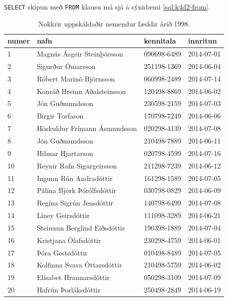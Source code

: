 \verb|SELECT| skipun með \verb|FROM| klausu má sjá á sýnidæmi \ref{sql:k4d2-from}.

\begin{table}
\centering
\caption[Nemendur]{Nokkrir uppskáldaðir nemendur fæddir árið 1998.}
\label{tafla:nemendur}
\begin{tabular}{llll}
\toprule
numer&nafn&kennitala&innritun\\
\midrule
1&Magnús Ásgeir Steinþórsson&090698-6489& 2014-07-01\\
2&Sigurður Ómarsson&251198-1369& 2014-06-04\\
3&Róbert Marinó Björnsson&060998-2489& 2014-07-14\\
4&Konráð Hreinn Aðalsteinsson&120498-8869& 2014-06-02\\
5&Jón Guðmundsson&230598-2159& 2014-07-03\\
6&Birgir Torfason&170798-7249& 2014-06-06\\
7&Höskuldur Frímann Ásmundsson&020298-4139& 2014-07-08\\
8&Jón Guðmundsson&210498-7889& 2014-06-11\\
9&Hilmar Hjartarson&020798-4599& 2014-07-16\\
10&Reynir Rafn Sigurgeirsson&211298-7239& 2014-06-12\\
11&Ingunn Rún Andradóttir&161298-1589& 2014-07-05\\
12&Pálína Björk Þórólfsdóttir&030798-0829& 2014-06-09\\
13&Regína Sigrún Jensdóttir&140798-6499& 2014-07-08\\
14&Líney Geirsdóttir&111098-3289& 2014-06-21\\
15&Steinunn Berglind Eiðsdóttir&190398-1889& 2014-07-04\\
16&Kristjana Ólafsdóttir&230298-4759& 2014-06-01\\
17&Þóra Gestsdóttir&010498-8489& 2014-07-05\\
18&Kolfinna Svava Óttarsdóttir&210498-5759& 2014-06-02\\
19&Elísabet Hrannarsdóttir&050298-3109& 2014-07-09\\
20&Hafrún Þorláksdóttir&250498-2849& 2014-06-19\\
\bottomrule
\end{tabular}
\end{table}

\begin{example}
\caption[SELECT FROM]{\emph{SELECT} skipun með \emph{FROM} klausu. Hún velur allan ``nafn'' dálkinn úr töflunni Nemendur (\ref{tafla:nemendur}).}
\label{sql:k4d2-from}
\centering
{}
\end{example}

